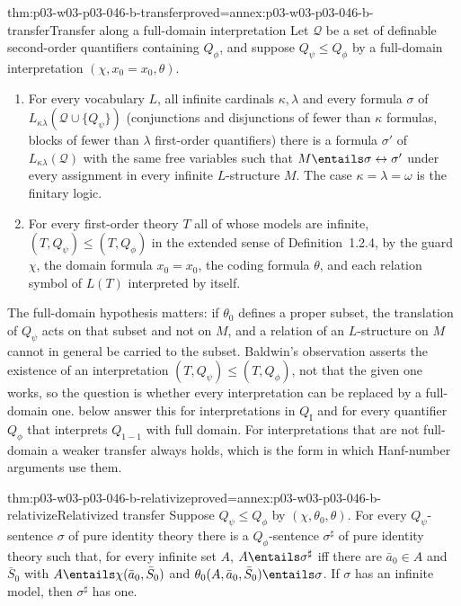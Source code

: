 \begin{hblemma}{thm:p03-w03-p03-046-b-transfer}{proved=annex:p03-w03-p03-046-b-transfer}{Transfer along a full-domain interpretation}
Let \(\mathcal Q\) be a set of definable second-order quantifiers containing
\(Q_\phi\), and suppose \(Q_\psi\le Q_\phi\) by a full-domain
interpretation \((\chi,x_0=x_0,\theta)\).
\begin{enumerate}
  \item For every vocabulary \(L\), all infinite cardinals
        \(\kappa,\lambda\) and every formula \(\sigma\) of
        \(L_{\kappa\lambda}(\mathcal Q\cup\{Q_\psi\})\) (conjunctions and
        disjunctions of fewer than \(\kappa\) formulas, blocks of fewer than
        \(\lambda\) first-order quantifiers) there is a formula \(\sigma'\)
        of \(L_{\kappa\lambda}(\mathcal Q)\) with the same free variables
        such that \(M\entails\sigma\leftrightarrow\sigma'\) under every
        assignment in every infinite \(L\)-structure \(M\). The case
        \(\kappa=\lambda=\omega\) is the finitary logic.
  \item For every first-order theory \(T\) all of whose models are
        infinite, \((T,Q_\psi)\le(T,Q_\phi)\) in the extended sense of
        Definition~1.2.4, by the guard \(\chi\), the domain formula
        \(x_0=x_0\), the coding formula \(\theta\), and each relation symbol
        of \(L(T)\) interpreted by itself.
\end{enumerate}
\end{hblemma}

The full-domain hypothesis matters: if \(\theta_0\) defines a proper subset,
the translation of \(Q_\psi\) acts on that subset and not on \(M\), and a
relation of an \(L\)-structure on \(M\) cannot in general be carried to the
subset. Baldwin's observation asserts the existence of an interpretation
\((T,Q_\psi)\le(T,Q_\phi)\), not that the given one works, so the question is
whether every interpretation can be replaced by a full-domain one.
below answer this for interpretations in \(Q_{\mathrm I}\) and for every
quantifier \(Q_\phi\) that interprets \(Q_{1-1}\) with full domain. For
interpretations that are not full-domain a weaker transfer always holds,
which is the form in which Hanf-number arguments use them.

\begin{hblemma}{thm:p03-w03-p03-046-b-relativize}{proved=annex:p03-w03-p03-046-b-relativize}{Relativized transfer}
Suppose \(Q_\psi\le Q_\phi\) by \((\chi,\theta_0,\theta)\). For every
\(Q_\psi\)-sentence \(\sigma\) of pure identity theory there is a
\(Q_\phi\)-sentence \(\sigma^\sharp\) of pure identity theory such that,
for every infinite set \(A\), \(A\entails\sigma^\sharp\) iff there are
\(\bar a_0\in A\) and \(\bar S_0\) with \(A\entails\chi(\bar a_0,\bar S_0)\)
and \(\theta_0(A,\bar a_0,\bar S_0)\entails\sigma\). If \(\sigma\) has an
infinite model, then \(\sigma^\sharp\) has one.
\end{hblemma}

